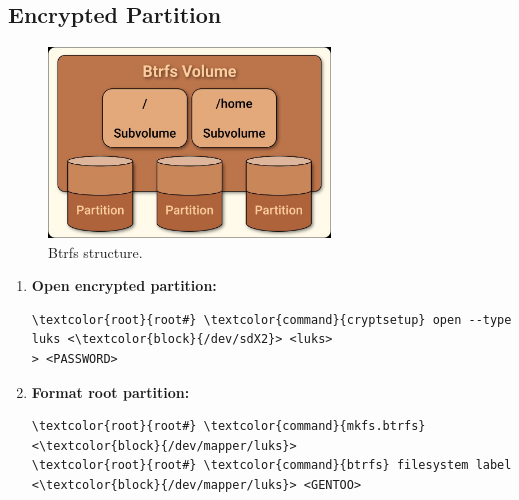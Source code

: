 \documentclass[10pt, a4paper, onecolumn, oneside, titlepage, openany]{book}
\begin{document}
\subsection{Encrypted Partition}
\begin{figure}[ht]
    \begin{center}
        \includegraphics[width=75mm]{./src/img/btrfs.png}
        \caption{Btrfs structure.}
        \label{fig:1}
    \end{center}
\end{figure}
\begin{enumerate}
    \item \textbf{Open encrypted partition:}
\begin{Verbatim}[commandchars=\\\{\}]
\textcolor{root}{root#} \textcolor{command}{cryptsetup} open --type luks <\textcolor{block}{/dev/sdX2}> <luks>
> <PASSWORD>
\end{Verbatim}
    \item \textbf{Format root partition:}
\begin{Verbatim}[commandchars=\\\{\}]
\textcolor{root}{root#} \textcolor{command}{mkfs.btrfs} <\textcolor{block}{/dev/mapper/luks}>
\textcolor{root}{root#} \textcolor{command}{btrfs} filesystem label <\textcolor{block}{/dev/mapper/luks}> <GENTOO>
\end{Verbatim}
\end{enumerate}
\end{document}
